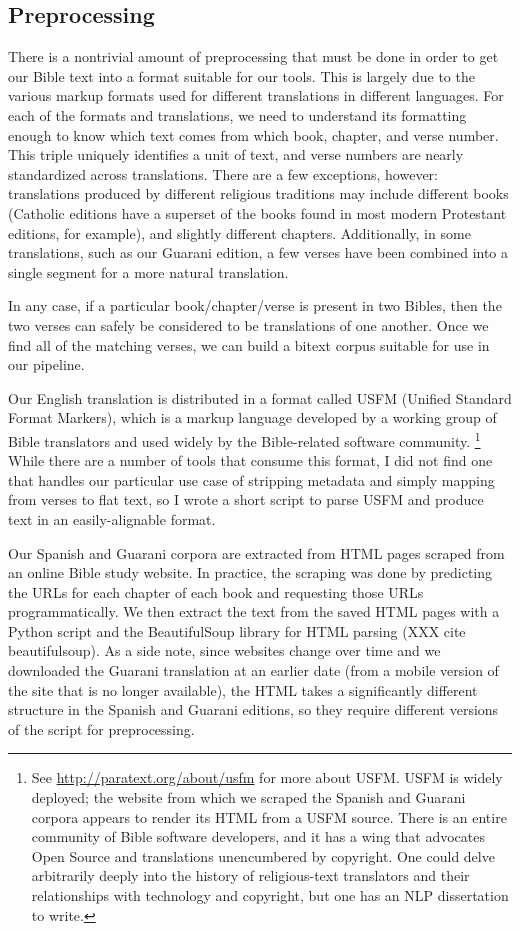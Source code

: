 \subsection{Preprocessing}
There is a nontrivial amount of preprocessing that must be done in order to get
our Bible text into a format suitable for our tools.
This is largely due to the various markup formats used for different
translations in different languages. For each of the formats and translations,
we need to understand its formatting enough to know which text comes from
which book, chapter, and verse number. This triple uniquely identifies a
unit of text, and verse numbers are nearly standardized across translations.
There are a few exceptions, however: translations produced by different
religious traditions may include different books (Catholic editions have
a superset of the books found in most modern Protestant editions, for example),
and slightly different chapters. Additionally, in some translations, such as
our Guarani edition, a few verses have been combined into a single segment for
a more natural translation.

In any case, if a particular book/chapter/verse is present in two Bibles, then
the two verses can safely be considered to be translations of one
another. Once we find all of the matching verses, we can build a bitext corpus
suitable for use in our pipeline.

Our English translation is distributed in a format called USFM (Unified
Standard Format Markers), which is a markup language developed by a working
group of Bible translators and used widely by the Bible-related software
community.
\footnote{See \url{http://paratext.org/about/usfm} for more about USFM. USFM is
widely deployed; the website from which we scraped the Spanish and Guarani
corpora appears to render its HTML from a USFM source. 
There is an entire community of Bible software developers, and it has a wing
that advocates Open Source and translations unencumbered by copyright.  One
could delve arbitrarily deeply into the history of religious-text translators
and their relationships with technology and copyright, but one has an NLP
dissertation to write.}
While there are a number of tools that consume this format, I did not find one
that handles our particular use case of stripping metadata and simply mapping
from verses to flat text, so I wrote a short script to parse USFM and produce
text in an easily-alignable format.

Our Spanish and Guarani corpora are extracted from HTML pages scraped from an
online Bible study website. In practice, the scraping was done by predicting
the URLs for each chapter of each book and requesting those URLs
programmatically. We then extract the text from the saved HTML pages with a
Python script and the BeautifulSoup library for HTML parsing (XXX cite
beautifulsoup). As a side note, since websites change over time and we
downloaded the Guarani translation at an earlier date (from a mobile version of
the site that is no longer available), the HTML takes a significantly different
structure in the Spanish and Guarani editions, so they require different
versions of the script for preprocessing.

